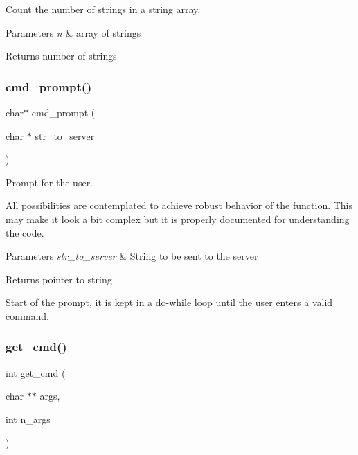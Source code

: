 Count the number of strings in a string array. 


\begin{DoxyParams}{Parameters}
{\em n} & array of strings \\
\hline
\end{DoxyParams}
\begin{DoxyReturn}{Returns}
number of strings 
\end{DoxyReturn}
\mbox{\label{prompt_8c_ac78cdc81595d63a0c876d3e3e8d2db70}} 
\subsubsection{cmd\+\_\+prompt()}
{\footnotesize\ttfamily char$\ast$ cmd\+\_\+prompt (\begin{DoxyParamCaption}\item[{char $\ast$}]{str\+\_\+to\+\_\+server }\end{DoxyParamCaption})}



Prompt for the user. 

All possibilities are contemplated to achieve robust behavior of the function. This may make it look a bit complex but it is properly documented for understanding the code. 
\begin{DoxyParams}{Parameters}
{\em str\+\_\+to\+\_\+server} & String to be sent to the server \\
\hline
\end{DoxyParams}
\begin{DoxyReturn}{Returns}
pointer to string  
\end{DoxyReturn}
Start of the prompt, it is kept in a do-\/while loop until the user enters a valid command.\mbox{\label{prompt_8c_a4eab3617254ab77fc2a44c5ff882f5f3}} 
\subsubsection{get\+\_\+cmd()}
{\footnotesize\ttfamily int get\+\_\+cmd (\begin{DoxyParamCaption}\item[{char $\ast$$\ast$}]{args,  }\item[{int}]{n\+\_\+args }\end{DoxyParamCaption})}



